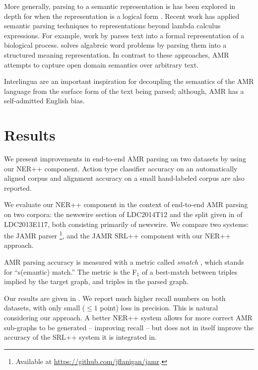 \documentclass[11pt]{article}
\newcommand\w[1]{\textit{#1}} %
\begin{document}
More generally, parsing to a semantic representation is has been explored in
  depth for when the representation is a logical form
  \cite{2005kate-semantics,2005zettlemoyer-semantics,2011liang-semantics}.
Recent work has applied semantic parsing techniques to representations beyond
  lambda calculus expressions.
For example, work by  parses
  text into a formal representation of a biological process.
 solves algabreic word problems by parsing them
  into a structured meaning representation.
In contrast to these approaches, AMR attempts to capture open domain semantics
  over arbitrary text.

Interlingua
  \cite{1991mitamura-interlingua,1999carbonell-interlingua,1998levin-interlingua}
  are an important inspiration for decoupling the semantics of the AMR language
  from the surface form of the text being parsed; although, AMR has a self-admitted
  English bias.




\section{Results}
We present improvements in end-to-end AMR parsing on two datasets by using our NER++ component.
Action type classifier accuracy on an automatically aligned corpus
and alignment accuracy on a small hand-labeled corpus are also reported.

We evaluate our NER++ component in the context of end-to-end AMR parsing
on two corpora: the newswire section of LDC2014T12 and the split given in \cite{2014flanigan-amr} of LDC2013E117, both consisting primarily of newswire.
We compare two systems: the JAMR parser \cite{2014flanigan-amr}
\footnote{Available at \url{https://github.com/jflanigan/jamr}.},
  and the JAMR SRL++ component with our NER++ approach.

AMR parsing accuracy is measured with a metric called \w{smatch} \cite{cai2013smatch-amr}, which stands 
  for ``s(emantic) match.'' 
The metric is the F$_1$ of a best-match between triples implied by the target graph, 
  and triples in the parsed graph. 

Our results are given in .
We report much higher recall numbers on both datasets, with only small ($\leq 1$ point) 
  loss in precision.
This is natural considering our approach.
A better NER++ system allows for more correct AMR sub-graphs to be generated --
  improving recall -- but does not in itself improve the accuracy of the
  SRL++ system it is integrated in.
\end{document}
